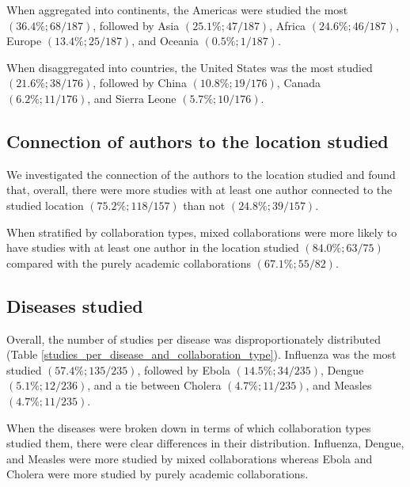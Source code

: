 \documentclass[10pt,letterpaper]{article}
\begin{document}
When aggregated into continents, the Americas were studied the most $(36.4\%; 68/187)$, followed by Asia $(25.1\%;47/187)$, Africa $(24.6\%; 46/187)$, Europe $(13.4\%; 25/187)$, and Oceania $(0.5\%; 1/187)$.

When disaggregated into countries, the United States was the most studied $(21.6\%; 38/176)$, followed by China $(10.8\%; 19/176)$, Canada $(6.2\%; 11/176)$, and Sierra Leone $(5.7\%; 10/176)$.

\subsection*{Connection of authors to the location studied}
We investigated the connection of the authors to the location studied and found that, overall, there were more studies with at least one author connected to the studied location $(75.2\%; 118/157)$ than not $(24.8\%; 39/157)$. 

When stratified by collaboration types, mixed collaborations were more likely to have studies with at least one author in the location studied $(84.0\%; 63/75)$ compared with the purely academic collaborations $(67.1\%; 55/82)$. 

\subsection*{Diseases studied}
Overall, the number of studies per disease was disproportionately distributed (Table \ref{studies_per_disease_and_collaboration_type}). Influenza was the most studied $(57.4\%; 135/235)$, followed by Ebola $(14.5\%; 34/235)$, Dengue $(5.1\%; 12/236)$, and a tie between Cholera $(4.7\%; 11/235)$, and Measles $(4.7\%; 11/235)$. 

When the diseases were broken down in terms of which collaboration types studied them, there were clear differences in their distribution. Influenza, Dengue, and Measles were more studied by mixed collaborations whereas Ebola and Cholera were more studied by purely academic collaborations. 
\end{document}
